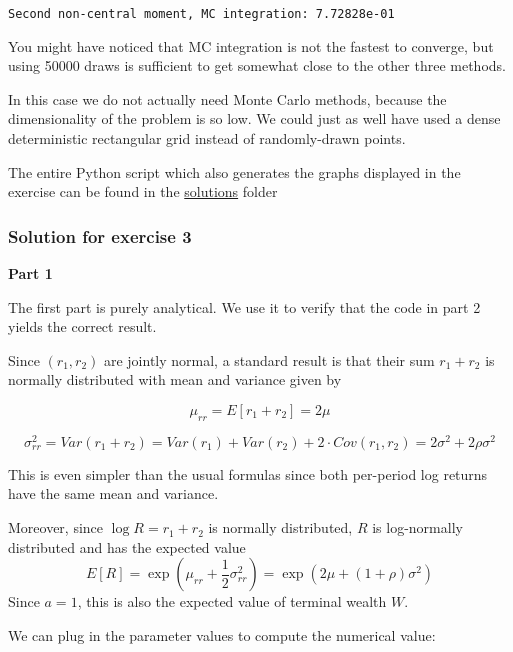 \documentclass{scrartcl}
\begin{document}
    \begin{Verbatim}[commandchars=\\\{\}]
Second non-central moment, MC integration: 7.72828e-01
    \end{Verbatim}

    You might have noticed that MC integration is not the fastest to
converge, but using 50000 draws is sufficient to get somewhat close to
the other three methods.

In this case we do not actually need Monte Carlo methods, because the
dimensionality of the problem is so low. We could just as well have used
a dense deterministic rectangular grid instead of randomly-drawn points.

The entire Python script which also generates the graphs displayed in
the exercise can be found in the
\href{../lectures/solutions/unit7}{solutions} folder

    \hypertarget{solution-for-exercise-3}{%
\subsubsection{Solution for exercise 3}\label{solution-for-exercise-3}}

\textbf{Part 1}

The first part is purely analytical. We use it to verify that the code
in part 2 yields the correct result.

Since \((r_1, r_2)\) are jointly normal, a standard result is that their
sum \(r_1 + r_2\) is normally distributed with mean and variance given
by

\[\mu_{rr} = E[r_1 + r_2] = 2\mu \]

\[
\sigma^2_{rr} = Var(r_1+r_2) = Var(r_1) + Var(r_2) + 2\cdot Cov(r_1,r_2) = 2\sigma^2 + 2\rho\sigma^2 
\]

This is even simpler than the usual formulas since both per-period log
returns have the same mean and variance.

Moreover, since \(\log R = r_1 + r_2\) is normally distributed, \(R\) is
log-normally distributed and has the expected value \[
E[R] = \exp\left(\mu_{rr} + \frac{1}{2}\sigma_{rr}^2 \right)
    = \exp\left(2\mu + (1+\rho) \sigma^2 \right)
\] Since \(a = 1\), this is also the expected value of terminal wealth
\(W\).

We can plug in the parameter values to compute the numerical value:
\end{document}
